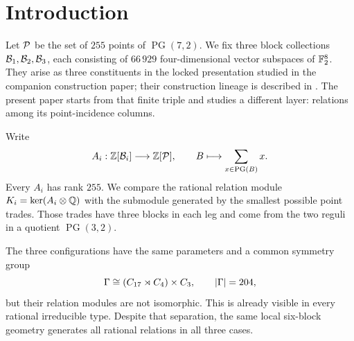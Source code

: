 \section{Introduction}
\label{sec:introduction}

Let \(\mathcal P\) be the set of \(255\) points of
\(\operatorname{PG}(7,2)\).  We fix three block collections
\(\mathcal B_1,\mathcal B_2,\mathcal B_3\), each consisting of \(66\,929\)
four-dimensional vector subspaces of \(\mathbb F_2^8\).  They arise as three
constituents in the locked presentation studied in the companion
construction paper; their construction lineage is described in
\cite{KLW2018}.  The present paper starts from that finite triple and
studies a different layer: relations among its point-incidence columns.

Write
\[
 A_i:\mathbb Z[\mathcal B_i]\longrightarrow \mathbb Z[\mathcal P],
 \qquad
 B\longmapsto \sum_{x\in \operatorname{PG}(B)}x.
\]
Every \(A_i\) has rank \(255\).  We compare the rational relation module
\(K_i=\ker(A_i\otimes\mathbb Q)\) with the submodule generated by the smallest
possible point trades.  Those trades have three blocks in each leg and
come from the two reguli in a quotient \(\operatorname{PG}(3,2)\).

The three configurations have the same parameters and a common symmetry
group
\[
 \Gamma\cong (C_{17}\rtimes C_4)\times C_3,
 \qquad |\Gamma|=204,
\]
but their relation modules are not isomorphic.  This is already visible
in every rational irreducible type.  Despite that separation, the same
local six-block geometry generates all rational relations in all three
cases.

